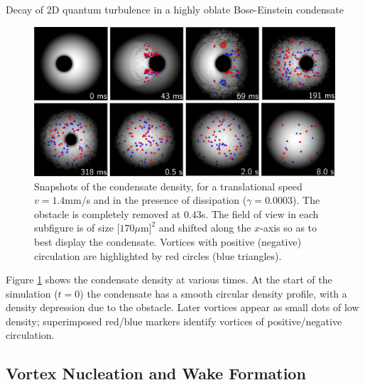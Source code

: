 \begin{chapter}{\label{cha:shin}Decay of 2D quantum turbulence in a highly oblate Bose-Einstein condensate}
\begin{figure}
\centering
\includegraphics[width=0.95\linewidth]{shin/fig2_4x2}
\caption{\label{fig:densSnapshots} Snapshots of the condensate density, for a translational speed $v=1.4$mm/s and in the presence of dissipation ($\gamma=0.0003$). The obstacle is completely removed at $0.43$s. The field of view in each subfigure is of size $[170\mu$m$]^2$ and shifted along the $x$-axis so as to best display the condensate.  Vortices with positive (negative) circulation are highlighted by red circles (blue triangles).
}
\end{figure}

Figure \ref{fig:densSnapshots} shows the condensate density at various times. At the start of the simulation ($t=0$) the condensate has a smooth circular density profile, with a density depression due to the obstacle.  Later vortices appear as small dots of low density; superimposed red/blue markers identify vortices of positive/negative circulation.

\subsection{Vortex Nucleation and Wake Formation}


\end{chapter}
